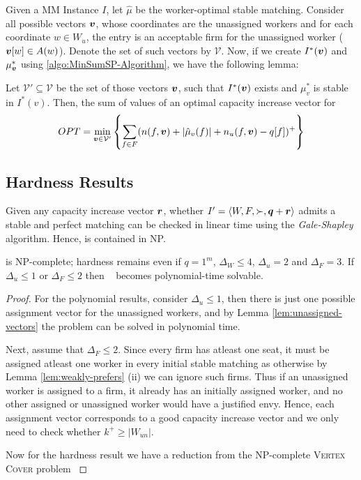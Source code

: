 Given a MM Instance $I$, let $\hat\mu$ be the worker-optimal stable matching. Consider all possible vectors ${\boldsymbol{v}}$, whose coordinates are the unassigned workers and for each coordinate $w \in W_u$, the entry is an acceptable firm for the unassigned worker (${\boldsymbol{v}}[w] \in A(w)$). Denote the set of such vectors by $\mathcal{V}$. Now, if we create $I^*({\boldsymbol{v}})$ and $\mu^*_{\boldsymbol{v}}$ using \autoref{algo:MinSumSP-Algorithm}, we have the following lemma:

\begin{lemma}
  \label{lem:unassigned-vectors}
  Let $\mathcal{V}' \subseteq \mathcal{V}$ be the set of those vectors ${\boldsymbol{v}}$, such that $I^*({\boldsymbol{v}})$ exists and $\mu^*_v$ is stable in $I^*(v)$. Then, the sum of values of an optimal capacity increase vector for \MinSumSP
  $$OPT = \min\limits_{{\boldsymbol{v}} \in \mathcal{V}'} \left\{ \sum\limits_{f \in F} (n(f, {\boldsymbol{v}}) + |\hat{\mu}_v(f)| + n_u(f, {\boldsymbol{v}}) - q[f])^+ \right\}$$
\end{lemma}

\subsection{Hardness Results}

Given any capacity increase vector $\boldsymbol{r}$, whether $I' = \left< W, F, \succ, \boldsymbol{q} + \boldsymbol{r} \right>$ admits a stable and perfect matching can be checked in linear time using the \textit{Gale-Shapley} algorithm. Hence, \MinSumSP is contained in NP.

\begin{theorem}
  \label{th:MinSumSP-NP-complete}
  \MinSumSP is NP-complete; hardness remains even if $q = 1^m$, $\Delta_W \leq 4$, $\Delta_u = 2$ and $\Delta_F = 3$. If $\Delta_u \leq 1$ or $\Delta_F \leq 2$ then \MinSumSP~ becomes polynomial-time solvable.
\end{theorem}

\begin{proof}
  For the polynomial results, consider $\Delta_u \leq 1$, then there is just one possible assignment vector for the unassigned workers, and by Lemma \ref{lem:unassigned-vectors} the problem can be solved in polynomial time.

  Next, assume that $\Delta_F \leq 2$. Since every firm has atleast one seat, it must be assigned atleast one worker in every initial stable matching as otherwise by Lemma \ref{lem:weakly-prefers} (ii) we can ignore such firms. Thus if an unassigned worker is assigned to a firm, it already has an initially assigned worker, and no other assigned or unassigned worker would have a justified envy. Hence, each assignment vector corresponds to a good capacity increase vector and we only need to check whether $k^+ \geq |W_{un}|$.

  Now for the hardness result we have a reduction from the NP-complete \textsc{Vertex Cover} problem \cite{chen2024optimal}
\end{proof}

